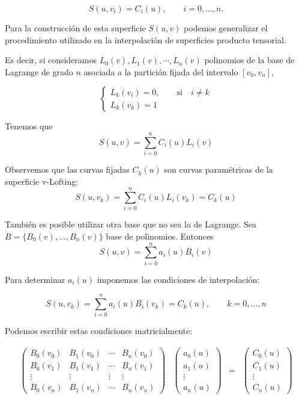 \documentclass[ebook,oneside]{memoir}
\begin{document}
$$S(u,v_i)=C_i(u),\quad \quad i=0,\ldots,n.$$

Para la construcci\'{o}n de esta superficie $S(u,v)$ podemos generalizar el procedimiento utilizado en la interpolaci\'{o}n de superficies producto tensorial.

Es decir, si consideramos $L_0(v), L_1(v), \cdots,L_n(v)$ polinomios de la base  de Lagrange de grado $n$ asociada a la partici\'{o}n fijada del intervalo $[v_0,v_n]$,

$$\left\{ \begin{array}{l}
L_k(v_i)=0,\quad \quad \mbox{si} \quad  i\neq k\\
L_k(v_k)=1
\end{array} \right.$$

Tenemos que
$$S(u,v)=\sum_{i=0}^n C_i(u) L_i(v)$$

Observemos que las curvas fijadas $C_k(u)$ son curvas param\'{e}tricas de la superficie v-Lofting:
$$S(u,v_k)=\sum_{i=0}^n C_i(u) L_i(v_k)=C_k(u)$$

Tambi\'{e}n es posible utilizar otra base que no sea la de Lagrange. Sea  $B=\{B_0(v), \ldots,B_n(v)\}$  base de polinomios. Entonces
$$S(u,v)=\sum_{i=0}^n a_i(u) B_i(v)$$

Para determinar $a_i(u)$ imponemos las condiciones de interpolaci\'{o}n:

$$S(u,v_k)=\sum_{i=0}^n a_i(u) B_i(v_k)=C_k(u), \quad \quad k=0,\ldots,n $$

Podemos escribir estas condiciones matricialmente:

$$\begin{array}{cccc}
\left( \begin{array}{cccc} B_0(v_0)&B_1(v_0)& \cdots&
B_n(v_0)\\B_0(v_1)&B_1(v_1)& \cdots& B_n(v_1)\\ \vdots& \vdots &
\vdots & \vdots \\ B_0(v_n)&B_1(v_n)& \cdots & B_n(v_n)
\end{array} \right) & \left( \begin{array}{c} a_0(u)\\a_1(u) \\
\vdots \\ a_n(u)
\end{array} \right) & = & \left( \begin{array}{c} C_0(u) \\ C_1(u) \\
\vdots \\ C_n(u)
\end{array} \right)
\end{array}$$
\end{document}
